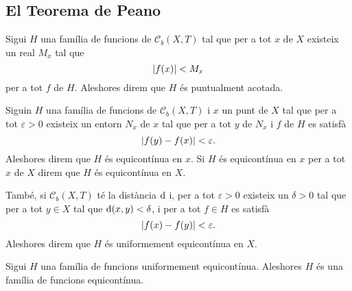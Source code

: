 \documentclass[../Apunts.tex]{subfiles}
\begin{document}
	\subsection{El Teorema de Peano}
	\begin{definition}
		\label{def:família de funcions puntualment acotada}
		Sigui \(H\) una família de funcions de \(\mathcal{C}_{b}(X,T)\) tal que per a tot \(x\) de \(X\) existeix un real \(M_{x}\) tal que
		\[\norm{f(x)}<M_{x}\]
		per a tot \(f\) de \(H\). Aleshores direm que \(H\) és puntualment acotada.
	\end{definition}
	\begin{definition}
		\label{def:família de funcions equicontínua en un punt}
		\label{def:família de funcions equicontínua}
		\label{def:família de funcions uniformement equicontínua}
		Siguin \(H\) una família de funcions de \(\mathcal{C}_{b}(X,T)\) i \(x\) un punt de \(X\) tal que per a tot \(\varepsilon>0\) existeix un entorn \(N_{x}\) de \(x\) tal que per a tot \(y\) de \(N_{x}\) i \(f\) de \(H\) es satisfà
		\[\norm{f(y)-f(x)}<\varepsilon.\]
		Aleshores direm que \(H\) és equicontínua en \(x\). Si \(H\) és equicontínua en \(x\) per a tot \(x\) de \(X\) direm que \(H\) és equicontínua en \(X\).
		
		També, si \(\mathcal{C}_{b}(X,T)\) té la distància \(\operatorname{d}\) i, per a tot \(\varepsilon>0\) existeix un \(\delta>0\) tal que per a tot \(y\in X\) tal que \(\operatorname{d}(x,y)<\delta\), i per a tot \(f\in H\) es satisfà
		\[\norm{f(x)-f(y)}<\varepsilon.\]
		Aleshores direm que \(H\) és uniformement equicontínua en \(X\).
	\end{definition}
	\begin{observation}
		\label{obs:equicontinuitat uniforme implica equicontinuitat}
		Sigui \(H\) una família de funcions uniformement equicontínua. Aleshores \(H\) és una família de funcions equicontínua.
	\end{observation}
\end{document}
